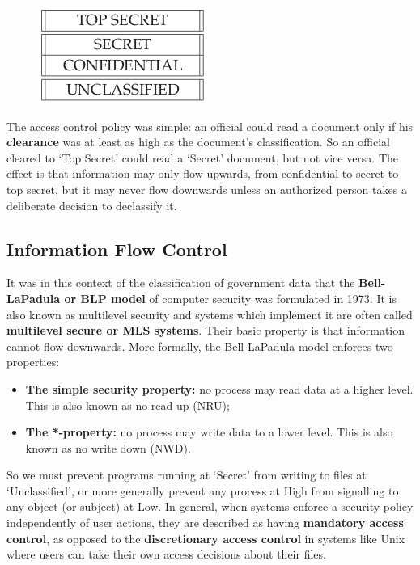 			\begin{figure}[H]
				\includegraphics[scale=0.6]{pics/multilevelSecurity.png}
			\end{figure}

			The access control policy was simple: an official could read a document
			only if his {\bf clearance} was at least as high as the document’s classification. 
			So an official cleared to ‘Top Secret’ could read a ‘Secret’ document, but not vice
			versa. The effect is that information may only flow upwards, from confidential
			to secret to top secret, but it may never flow downwards unless an authorized
			person takes a deliberate decision to declassify it.

		\subsection{Information Flow Control}
			It was in this context of the classification of government data that the 
			{\bf Bell- LaPadula or BLP model} of computer security was formulated in 1973. 
			It is also known as multilevel security and systems which implement it are often
			called {\bf multilevel secure or MLS systems}. 
			Their basic property is that information cannot flow downwards.
			More formally, the Bell-LaPadula model enforces two properties:

				\begin{itemize}
					\item {\bf The simple security property:} no process may read data 
					at a higher level. This is also known as no read up (NRU);
					\item {\bf The *-property:} no process may write data to a lower level. 
					This is also known as no write down (NWD).
				\end{itemize}

			So we must prevent programs running at ‘Secret’ from writing to files at
			‘Unclassified’, or more generally prevent any process at High from signalling
			to any object (or subject) at Low. In general, when systems enforce a security
			policy independently of user actions, they are described as having 
			{\bf mandatory access control}, as opposed to the {\bf discretionary access control} 
			in systems like Unix where users can take their own access decisions about their files.


